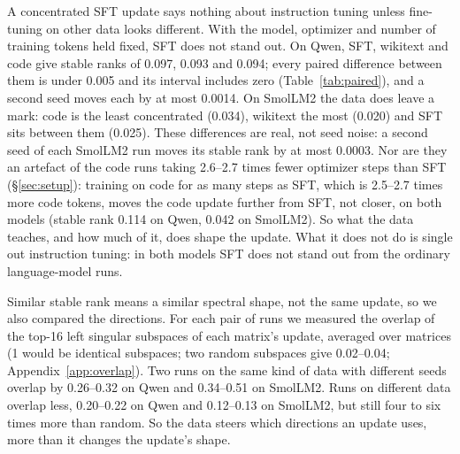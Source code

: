 A concentrated SFT update says nothing about instruction tuning unless
fine-tuning on other data looks different. With the model, optimizer and
number of training tokens held fixed, SFT does not stand out. On Qwen, SFT,
wikitext and code give stable ranks of 0.097, 0.093 and 0.094; every paired
difference between them is under 0.005 and its interval includes zero
(Table~\ref{tab:paired}), and a second seed moves each by at most 0.0014. On
SmolLM2 the data does leave a mark: code is the least concentrated (0.034),
wikitext the most (0.020) and SFT sits between them (0.025). These
differences are real, not seed noise: a second seed of each SmolLM2 run moves
its stable rank by at most 0.0003. Nor are they an artefact of the code runs
taking 2.6--2.7 times fewer optimizer steps than SFT (\S\ref{sec:setup}): training on
code for as many steps as SFT, which is 2.5--2.7 times more code tokens, moves the
code update further from SFT, not closer, on both models (stable rank 0.114
on Qwen, 0.042 on SmolLM2). So what the data teaches, and how much of it, does
shape the update. What it does not do is single out instruction tuning: in
both models SFT does not stand out from the ordinary language-model runs.

Similar stable rank means a similar spectral shape, not the same update, so we
also compared the directions. For each pair of runs we measured the overlap of
the top-16 left singular subspaces of each matrix's update, averaged over
matrices (1 would be identical subspaces; two random subspaces give 0.02--0.04;
Appendix~\ref{app:overlap}). Two runs on the same kind of data with different
seeds overlap by 0.26--0.32 on Qwen and 0.34--0.51 on SmolLM2. Runs on
different data overlap less, 0.20--0.22 on Qwen and 0.12--0.13 on SmolLM2, but
still four to six times more than random. So the data steers which directions
an update uses, more than it changes the update's shape.

